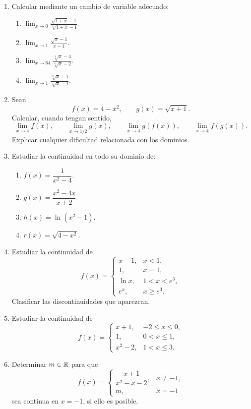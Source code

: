 \begin{enumerate}[label=\textbf{\arabic*.},leftmargin=*]
\item Calcular mediante un cambio de variable adecuado:
\begin{enumerate}[label=\alph*)]
\item $\displaystyle\lim_{x\to0}\frac{\sqrt{1+x}-1}{\sqrt[3]{1+x}-1}$.
\item $\displaystyle\lim_{x\to1}\frac{\sqrt{x}-1}{x-1}$.
\item $\displaystyle\lim_{x\to64}\frac{\sqrt[3]{x}-4}{\sqrt[6]{x}-2}$.
\item $\displaystyle\lim_{x\to1}\frac{\sqrt[3]{x}-1}{\sqrt[4]{x}-1}$.
\end{enumerate}

\item Sean
\[
f(x)=4-x^2,
\qquad
g(x)=\sqrt{x+1}.
\]
Calcular, cuando tengan sentido,
\[
\lim_{x\to4}f(x),
\qquad
\lim_{x\to1/2}g(x),
\qquad
\lim_{x\to4}g(f(x)),
\qquad
\lim_{x\to4}f(g(x)).
\]
Explicar cualquier dificultad relacionada con los dominios.

\item Estudiar la continuidad en todo su dominio de:
\begin{enumerate}[label=\alph*)]
\item $f(x)=\dfrac{1}{x^2-4}$.
\item $g(x)=\dfrac{x^2-4x}{x+2}$.
\item $h(x)=\ln(x^2-1)$.
\item $r(x)=\sqrt{4-x^2}$.
\end{enumerate}

\item Estudiar la continuidad de
\[
f(x)=
\begin{cases}
x-1,&x<1,\\
1,&x=1,\\
\ln x,&1<x<e^3,\\
e^x,&x\geq e^3.
\end{cases}
\]
Clasificar las discontinuidades que aparezcan.

\item Estudiar la continuidad de
\[
f(x)=
\begin{cases}
x+1,&-2\leq x\leq0,\\
1,&0<x\leq1,\\
x^2-2,&1<x\leq3.
\end{cases}
\]

\item Determinar $m\in\mathbb{R}$ para que
\[
f(x)=
\begin{cases}
\dfrac{x+1}{x^2-x-2},&x\neq-1,\\
m,&x=-1
\end{cases}
\]
sea continua en $x=-1$, si ello es posible.


\end{enumerate}
